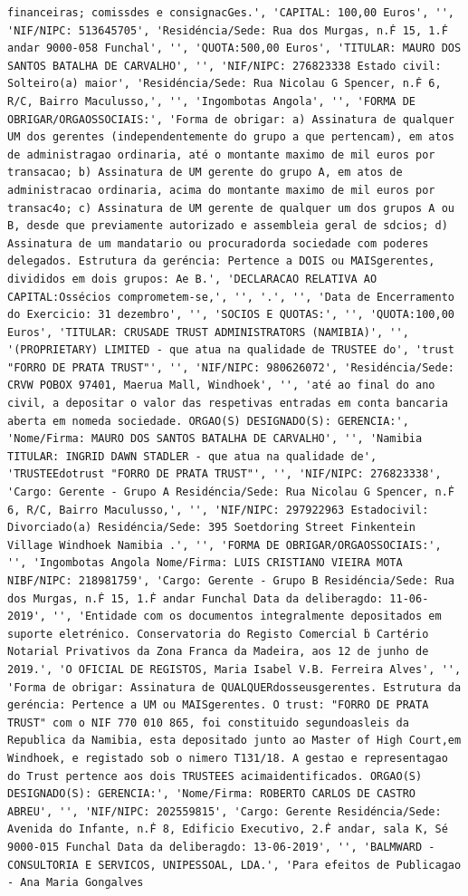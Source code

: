 \documentclass[
  12pt,
]{article}
\begin{document}
\begin{verbatim}
financeiras; comissdes e consignacGes.', 'CAPITAL: 100,00 Euros', '', 'NIF/NIPC: 513645705', 'Residéncia/Sede: Rua dos Murgas, n.Ḟ 15, 1.Ḟ andar 9000-058 Funchal', '', 'QUOTA:500,00 Euros', 'TITULAR: MAURO DOS SANTOS BATALHA DE CARVALHO', '', 'NIF/NIPC: 276823338 Estado civil: Solteiro(a) maior', 'Residéncia/Sede: Rua Nicolau G Spencer, n.Ḟ 6, R/C, Bairro Maculusso,', '', 'Ingombotas Angola', '', 'FORMA DE OBRIGAR/ORGAOSSOCIAIS:', 'Forma de obrigar: a) Assinatura de qualquer UM dos gerentes (independentemente do grupo a que pertencam), em atos de administragao ordinaria, até o montante maximo de mil euros por transacao; b) Assinatura de UM gerente do grupo A, em atos de administracao ordinaria, acima do montante maximo de mil euros por transac4o; c) Assinatura de UM gerente de qualquer um dos grupos A ou B, desde que previamente autorizado e assembleia geral de sdcios; d) Assinatura de um mandatario ou procuradorda sociedade com poderes delegados. Estrutura da geréncia: Pertence a DOIS ou MAISgerentes, divididos em dois grupos: Ae B.', 'DECLARACAO RELATIVA AO CAPITAL:Ossécios comprometem-se,', '', '.', '', 'Data de Encerramento do Exercicio: 31 dezembro', '', 'SOCIOS E QUOTAS:', '', 'QUOTA:100,00 Euros', 'TITULAR: CRUSADE TRUST ADMINISTRATORS (NAMIBIA)', '', '(PROPRIETARY) LIMITED - que atua na qualidade de TRUSTEE do', 'trust "FORRO DE PRATA TRUST"', '', 'NIF/NIPC: 980626072', 'Residéncia/Sede: CRVW POBOX 97401, Maerua Mall, Windhoek', '', 'até ao final do ano civil, a depositar o valor das respetivas entradas em conta bancaria aberta em nomeda sociedade. ORGAO(S) DESIGNADO(S): GERENCIA:', 'Nome/Firma: MAURO DOS SANTOS BATALHA DE CARVALHO', '', 'Namibia TITULAR: INGRID DAWN STADLER - que atua na qualidade de', 'TRUSTEEdotrust "FORRO DE PRATA TRUST"', '', 'NIF/NIPC: 276823338', 'Cargo: Gerente - Grupo A Residéncia/Sede: Rua Nicolau G Spencer, n.Ḟ 6, R/C, Bairro Maculusso,', '', 'NIF/NIPC: 297922963 Estadocivil: Divorciado(a) Residéncia/Sede: 395 Soetdoring Street Finkentein Village Windhoek Namibia .', '', 'FORMA DE OBRIGAR/ORGAOSSOCIAIS:', '', 'Ingombotas Angola Nome/Firma: LUIS CRISTIANO VIEIRA MOTA NIBF/NIPC: 218981759', 'Cargo: Gerente - Grupo B Residéncia/Sede: Rua dos Murgas, n.Ḟ 15, 1.Ḟ andar Funchal Data da deliberagdo: 11-06-2019', '', 'Entidade com os documentos integralmente depositados em suporte eletrénico. Conservatoria do Registo Comercial ḃ Cartério Notarial Privativos da Zona Franca da Madeira, aos 12 de junho de 2019.', 'O OFICIAL DE REGISTOS, Maria Isabel V.B. Ferreira Alves', '', 'Forma de obrigar: Assinatura de QUALQUERdosseusgerentes. Estrutura da geréncia: Pertence a UM ou MAISgerentes. O trust: "FORRO DE PRATA TRUST" com o NIF 770 010 865, foi constituido segundoasleis da Republica da Namibia, esta depositado junto ao Master of High Court,em Windhoek, e registado sob o nimero T131/18. A gestao e representagao do Trust pertence aos dois TRUSTEES acimaidentificados. ORGAO(S) DESIGNADO(S): GERENCIA:', 'Nome/Firma: ROBERTO CARLOS DE CASTRO ABREU', '', 'NIF/NIPC: 202559815', 'Cargo: Gerente Residéncia/Sede: Avenida do Infante, n.Ḟ 8, Edificio Executivo, 2.Ḟ andar, sala K, Sé 9000-015 Funchal Data da deliberagdo: 13-06-2019', '', 'BALMWARD - CONSULTORIA E SERVICOS, UNIPESSOAL, LDA.', 'Para efeitos de Publicagao - Ana Maria Gongalves 
\end{verbatim}
\end{document}
